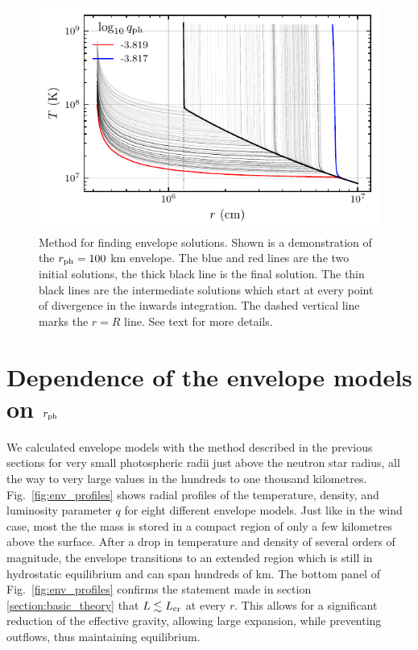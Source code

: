 \documentclass[../main.tex]{subfiles}
\begin{document}
\begin{figure}[htb!]
    \centering
    \includegraphics{figures/env_bisection_demo.pdf}
    \caption[Demonstration of the numerical method for envelopes]{Method for finding envelope solutions. Shown is a demonstration of the $r_\text{ph}=100$ km envelope. The blue and red lines are the two initial solutions, the thick black line is the final solution. The thin black lines are the intermediate solutions which start at every point of divergence in the inwards integration. The dashed vertical line marks the $r=R$ line. See text for more details.}
    \label{fig:env_bisection_demo}
\end{figure}


\section{Dependence of the envelope models on $r_\text{ph}$}\label{sec:env_results}
We calculated envelope models with the method described in the previous sections for very small photospheric radii just above the neutron star radius, all the way to very large values in the hundreds to one thousand kilometres. Fig.~\ref{fig:env_profiles} shows radial profiles of the temperature, density, and luminosity parameter $q$ for eight different envelope models. Just like in the wind case, most the the mass is stored in a compact region of only a few kilometres above the surface. After a drop in temperature and density of several orders of magnitude, the envelope transitions to an extended region which is still in hydrostatic equilibrium and can span hundreds of km. The bottom panel of Fig.~\ref{fig:env_profiles} confirms the statement made in section \ref{section:basic_theory} that $L\lesssim L_\text{cr}$ at every $r$. This allows for a significant reduction of the effective gravity, allowing large expansion, while preventing outflows, thus maintaining equilibrium. 
\end{document}
